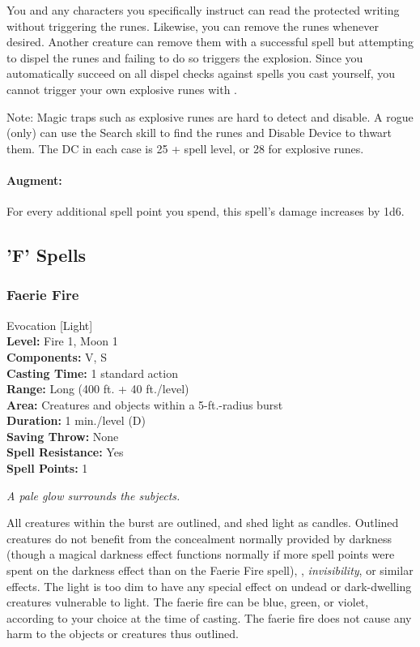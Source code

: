 You and any characters you specifically instruct can read the protected writing without triggering the runes. 
Likewise, you can remove the runes whenever desired. 
Another creature can remove them with a successful  spell %
but attempting to dispel the runes and failing to do so triggers the explosion.
Since you automatically succeed on all dispel checks against spells you cast yourself, 
you cannot trigger your own explosive runes with .

Note: Magic traps such as explosive runes are hard to detect and disable. 
A rogue (only) can use the Search skill to find the runes and Disable Device to thwart them. 
The DC in each case is 25 + spell level, or 28 for explosive runes.

\paragraph{Augment:} For every additional spell point you spend, this spell's damage increases by 1d6.
\subsection{'F' Spells}
\subsubsection{Faerie Fire}
\label{Spell:FaerieFire}
Evocation [Light]
\\ \textbf{Level:} Fire 1, Moon 1
\\ \textbf{Components:} V, S
\\ \textbf{Casting Time:} 1 standard action
\\ \textbf{Range:} Long (400 ft. + 40 ft./level)
\\ \textbf{Area:} Creatures and objects within a 5-ft.-radius burst
\\ \textbf{Duration:} 1 min./level (D)
\\ \textbf{Saving Throw:} None
\\ \textbf{Spell Resistance:} Yes
\\ \textbf{Spell Points:} 1

\emph{A pale glow surrounds the subjects.} 

All creatures within the burst are outlined, and shed light as candles. 
Outlined creatures do not benefit from the concealment normally provided by darkness (though a magical darkness effect functions normally if more spell points were spent on the darkness effect than on the Faerie Fire spell), , \emph{invisibility}, or similar effects. 
The light is too dim to have any special effect on undead or dark-dwelling creatures vulnerable to light. 
The faerie fire can be blue, green, or violet, according to your choice at the time of casting. 
The faerie fire does not cause any harm to the objects or creatures thus outlined.

